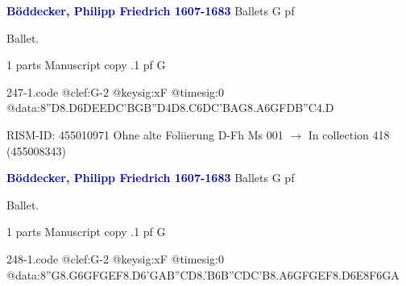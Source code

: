 \documentclass[twocolumn]{book}
\begin{document}
\newline \par \vspace{7pt} \textcolor{darkblue}{\textbf{Böddecker, Philipp Friedrich  1607-1683}}
\newline Ballets  G  
\newline pf
\newline \begin{itshape}[f.89v, at left:] Ballet.\end{itshape} 
\newline \textcolor{darkblue}{}  1 parts  
\newline Manuscript copy
.1  pf  G  
\begin{filecontents*}{247-1.code}
@clef:G-2
@keysig:xF
@timesig:0
@data:8''D{8.D6D}{EEDC}{'BGB''D}4D{8.C6D}{C'BAG}{8.A6G}{FDB''C}4.D
\end{filecontents*}
\newline
%

\newline RISM-ID: 455010971
\newline Ohne alte Foliierung
\newline D-Fh  Ms 001
\newline $\rightarrow$ In collection 418 (455008343)

\newline \par \vspace{7pt} \textcolor{darkblue}{\textbf{Böddecker, Philipp Friedrich  1607-1683}}
\newline Ballets  G  
\newline pf
\newline \begin{itshape}[f.89v, at left:] Ballet.\end{itshape} 
\newline \textcolor{darkblue}{}  1 parts  
\newline Manuscript copy
.1  pf  G  
\begin{filecontents*}{248-1.code}
@clef:G-2
@keysig:xF
@timesig:0
@data:8''G{8.G6G}{FGEF}{8.D6'G}{AB''CD}{8.'B6B}{''CDC'B}{8.A6G}{FGEF}{8.D6E}{8F6GA}
\end{filecontents*}
\newline
%
\end{document}
